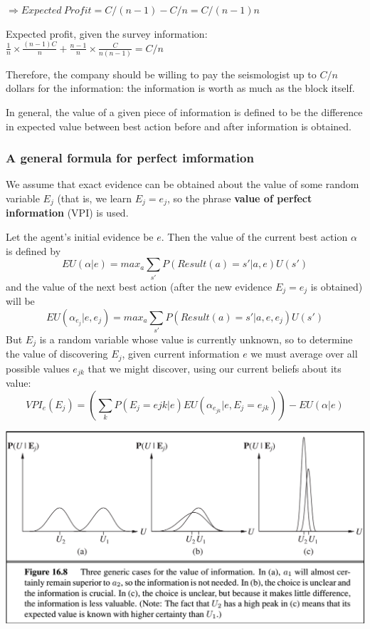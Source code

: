 \documentclass{scrartcl}
\begin{document}
 \(\Rightarrow Expected \ Profit = C/(n-1) - C/n = C/(n-1)n\) 

 Expected profit, given the survey information: \(\frac{1}{n} \times \frac{(n-1)C}{n} + \frac{n-1}{n} \times \frac{C}{n(n-1)} = C/n\)

 Therefore, the company should be willing to pay the seismologist up to \(C/n\) dollars for the information: the information is worth as much as the block itself.

 In general, the value of a given piece of information is defined to be the difference in expected value between best action before and after information is obtained.

\subsubsection{A general formula for perfect imformation}
We assume that exact evidence can be obtained about the value of some random variable \(E_j\) (that is, we learn \(E_j = e_j\), so the phrase \textbf{value of perfect information} (VPI) is used.

Let the agent's initial evidence be \(e\). Then the value of the current best action \(\alpha\) is defined by
\[EU(\alpha|e) = max_{a} \sum_{s'} P(Result(a) = s'|a, e) U(s')\]
and the value of the next best action (after the new evidence \(E_j = e_j\) is obtained) will be 
\[EU(\alpha_{e_j}|e, e_j) = max_a \sum_{s'} P(Result(a) = s' | a, e, e_j) U(s')\]
But \(E_j\) is a random variable whose value is currently unknown, so to determine the value of discovering \(E_j\), given current information \(e\) we must average over all possible values \(e_{jk}\) that we might discover, using our current beliefs about its value:
\[VPI_e(E_j) = (\sum_k P(E_j = ejk | e) EU(\alpha_{e_{jk}} | e, E_j = e_{jk})) - EU(\alpha|e)\]

\begin{center}
    \includegraphics[scale=0.4]{img/vpi.png}
\end{center}
\end{document}
